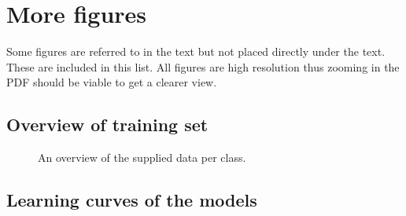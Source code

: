 \chapter*{More figures}

Some figures are referred to in the text but not placed directly under the text. These are included in this list. All figures are high resolution thus zooming in the PDF should be viable to get a clearer view.


\section*{Overview of training set}

\begin{figure}[H]
    \begin{center}
    \end{center}
    \captionsetup{width=0.65\linewidth}
    \captionsetup{justification=centering}
    \caption{An overview of the supplied data per class.}
    \label{fig:1-data_analysis-labeled_data_overview.png}
\end{figure}


\section*{Learning curves of the models}


